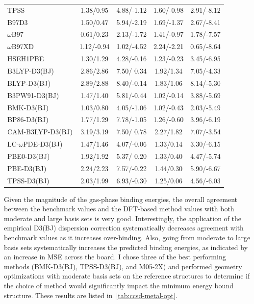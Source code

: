 \begin{longtable}[!htbp]{m{4cm} c c | c c}
TPSS\cite{Tao2003}   &  1.38/0.95 &  4.88/-1.12  &  1.60/-0.98 &  2.91/-8.12 \\
B97\cite{Becke1997}D3\cite{Grimme2010} &  1.50/0.47 &  5.94/-2.19  &  1.69/-1.37 &  2.67/-8.41 \\
$\omega$B97\cite{Chai2008a} &  0.61/0.23 &  2.13/-1.72  &  1.41/-0.97 &  1.78/-7.57 \\
$\omega$B97XD\cite{Chai2008} &  1.12/-0.94 &  1.02/-4.52  &  2.24/-2.21 &  0.65/-8.64 \\
HSEH1PBE\cite{Heyd2004, Heyd2005} &  1.30/1.29 &  4.28/-0.16  &  1.23/-0.23 &  3.45/-6.95 \\
B3LYP-D3(BJ)\cite{Grimme2010, Johnson2006} &  2.86/2.86 &  7.50/ 0.34  &  1.92/1.34 &  7.05/-4.33 \\
BLYP-D3(BJ)       &  2.89/2.88 &  8.40/-0.14  &  1.83/1.06 &  8.14/-5.30 \\
B3PW91-D3(BJ)     &  1.47/1.40 &  5.81/-0.44  &  1.02/-0.14 &  3.88/-5.69 \\
BMK-D3(BJ)        &  1.03/0.80 &  4.05/-1.06  &  1.02/-0.43 &  2.03/-5.49 \\
BP86-D3(BJ)       &  1.77/1.29 &  7.78/-1.05  &  1.26/-0.60 &  3.96/-6.19 \\
CAM-B3LYP-D3(BJ)  &  3.19/3.19 &  7.50/ 0.78  &  2.27/1.82 &  7.07/-3.54 \\
LC-$\omega$PDE-D3(BJ)& 1.47/1.46 & 4.07/-0.06 &  1.33/0.14 &  3.30/-6.15 \\
PBE0-D3(BJ)       &  1.92/1.92 &  5.37/ 0.20  &  1.33/0.40 &  4.47/-5.74 \\
PBE-D3(BJ)        &  2.24/2.23 &  7.57/-0.22  &  1.44/0.30 &  5.90/-6.67 \\
TPSS-D3(BJ)       &  2.03/1.99 &  6.93/-0.30  &  1.25/0.06 &  4.56/-6.03
\end{longtable}
\setlength\LTleft{0pt}
\setlength\LTright{0pt}

Given the magnitude of the gas-phase binding energies, the overall agreement
between the benchmark values and the DFT-based method values with both moderate
and large basis sets is very good. Interestingly, the application of the
empirical D3(BJ) dispersion correction systematically decreases agreement with
benchmark values as it increases over-binding. Also, going from moderate to
large basis sets systematically increases the predicted binding energies, as
indicated by an increase in MSE across the board. I chose three of the best
performing methods (BMK-D3(BJ), TPSS-D3(BJ), and M05-2X) and performed geometry
optimizations with moderate basis sets on the reference structures to determine
if the choice of method would significantly impact the minimum energy bound
structure. These results are listed in~\ref{tab:ccsd-metal-opt}.

